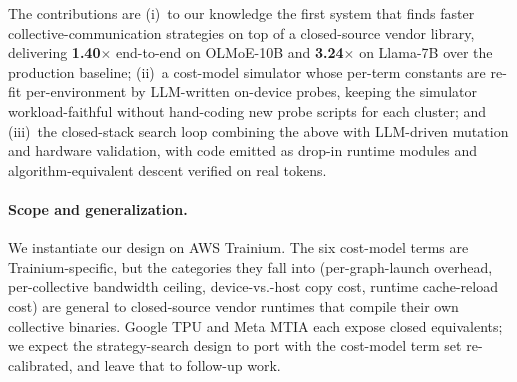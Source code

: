 The contributions are
(i)~to our knowledge the first system that finds faster
collective-communication strategies on top of a closed-source
vendor library, delivering \textbf{1.40$\times$} end-to-end on
OLMoE-10B and \textbf{3.24$\times$} on Llama-7B over the
production baseline;
(ii)~a cost-model simulator whose per-term constants are
re-fit per-environment by LLM-written on-device probes,
keeping the simulator workload-faithful without
hand-coding new probe scripts for each cluster; and
(iii)~the closed-stack search loop combining the above with
LLM-driven mutation and hardware validation, with code
emitted as drop-in runtime modules and algorithm-equivalent
descent verified on real tokens.

\paragraph{Scope and generalization.} We instantiate our design
on AWS Trainium. The six cost-model terms are Trainium-specific,
but the categories they fall into (per-graph-launch overhead,
per-collective bandwidth ceiling, device-vs.-host copy cost,
runtime cache-reload cost) are general to closed-source vendor
runtimes that compile their own collective binaries. Google TPU
and Meta MTIA each expose closed equivalents; we expect the
strategy-search design to port with the cost-model term set
re-calibrated, and leave that to follow-up work.
